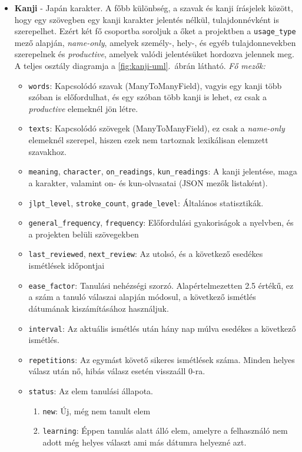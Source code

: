 \begin{itemize}
  \item \textbf{Kanji} - Japán karakter. A főbb különbség, a szavak és kanji írásjelek között, hogy egy szövegben egy kanji karakter jelentés nélkül, tulajdonnévként is szerepelhet. Ezért két fő csoportba soroljuk a őket a projektben a \texttt{usage\_type} mező alapján, \textit{name-only}, amelyek személy-, hely-, és egyéb tulajdonnevekben szerepelnek és \textit{productive}, amelyek valódi jelentésüket hordozva jelennek meg. A teljes osztály diagramja a \ref{fig:kanji-uml}.~ábrán látható.
  \textit{Fő mezők:}
  \begin{itemize}
    \item \texttt{words}: Kapcsolódó szavak (ManyToManyField), vagyis egy kanji több szóban is előfordulhat, és egy szóban több kanji is lehet, ez csak a \textit{productive} elemeknél jön létre.
    \item \texttt{texts}: Kapcsolódó szövegek (ManyToManyField), ez csak a \textit{name-only} elemeknél szerepel, hiszen ezek nem tartoznak lexikálisan elemzett szavakhoz.
    \item \texttt{meaning}, \texttt{character}, \texttt{on\_readings}, \texttt{kun\_readings}: A kanji jelentése, maga a karakter, valamint on- és kun-olvasatai (JSON mezők listaként).
    \item \texttt{jlpt\_level}, \texttt{stroke\_count}, \texttt{grade\_level}: Általános statisztikák.
    \item \texttt{general\_frequency}, \texttt{frequency}: Előfordulási gyakoriságok a nyelvben, és a projekten belüli szövegekben
    \item \texttt{last\_reviewed}, \texttt{next\_review}: Az utolsó, és a következő esedékes ismétlések időpontjai
    \item \texttt{ease\_factor}: Tanulási nehézségi szorzó. Alapértelmezetten 2.5 értékű, ez a szám a tanuló válaszai alapján módosul, a következő ismétlés dátumának kiszámításához használjuk.
    \item \texttt{interval}: Az aktuális ismétlés után hány nap múlva esedékes a következő ismétlés.
    \item \texttt{repetitions}:  Az egymást követő sikeres ismétlések száma. Minden helyes válasz után nő, hibás válasz esetén visszaáll 0-ra.
    \item \texttt{status}: Az elem tanulási állapota.
      \begin{enumerate}
          \item \texttt{new}: Új, még nem tanult elem
          \item \texttt{learning}: Éppen tanulás alatt álló elem, amelyre a felhasználó nem adott még helyes választ ami más dátumra helyezné azt.

\end{enumerate}
\end{itemize}
\end{itemize}
